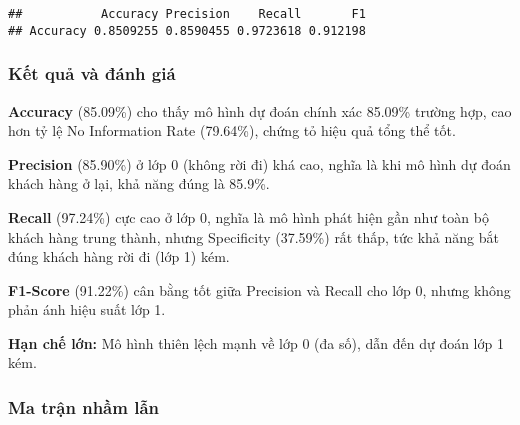 \documentclass[
]{article}
\newenvironment{Shaded}{\begin{snugshade}}{\end{snugshade}}
\newcommand{\AttributeTok}[1]{\textcolor[rgb]{0.13,0.29,0.53}{#1}}
\newcommand{\FunctionTok}[1]{\textcolor[rgb]{0.13,0.29,0.53}{\textbf{#1}}}
\newcommand{\NormalTok}[1]{#1}
\newcommand{\OtherTok}[1]{\textcolor[rgb]{0.56,0.35,0.01}{#1}}
\newcommand{\SpecialCharTok}[1]{\textcolor[rgb]{0.81,0.36,0.00}{\textbf{#1}}}
\newcommand{\StringTok}[1]{\textcolor[rgb]{0.31,0.60,0.02}{#1}}
\begin{document}
\begin{verbatim}
##           Accuracy Precision    Recall       F1
## Accuracy 0.8509255 0.8590455 0.9723618 0.912198
\end{verbatim}

\subsubsection{Kết quả và đánh giá}\label{sec-logistic-results}

\textbf{Accuracy} (85.09\%) cho thấy mô hình dự đoán chính xác 85.09\%
trường hợp, cao hơn tỷ lệ No Information Rate (79.64\%), chứng tỏ hiệu
quả tổng thể tốt.

\textbf{Precision} (85.90\%) ở lớp 0 (không rời đi) khá cao, nghĩa là
khi mô hình dự đoán khách hàng ở lại, khả năng đúng là 85.9\%.

\textbf{Recall} (97.24\%) cực cao ở lớp 0, nghĩa là mô hình phát hiện
gần như toàn bộ khách hàng trung thành, nhưng Specificity (37.59\%) rất
thấp, tức khả năng bắt đúng khách hàng rời đi (lớp 1) kém.

\textbf{F1-Score} (91.22\%) cân bằng tốt giữa Precision và Recall cho
lớp 0, nhưng không phản ánh hiệu suất lớp 1.

\textbf{Hạn chế lớn:} Mô hình thiên lệch mạnh về lớp 0 (đa số), dẫn đến
dự đoán lớp 1 kém.

\subsubsection{Ma trận nhầm lẫn}\label{sec-logistic-cm}

\begin{Shaded}
\end{Shaded}
\end{document}
